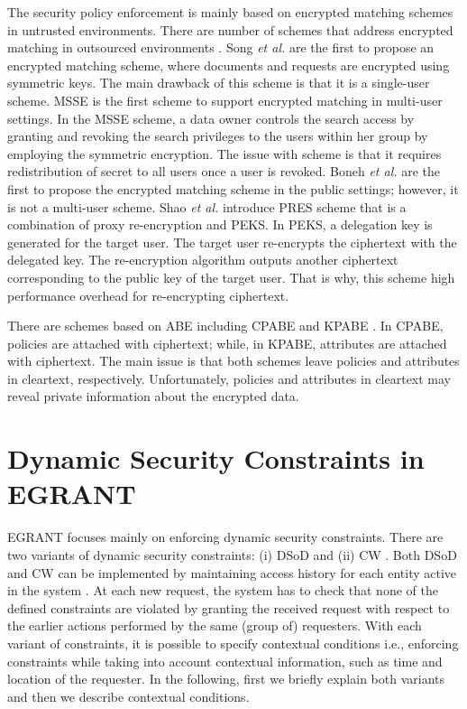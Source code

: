 \documentclass[epsfig,a4paper,11pt,titlepage]{book}
\numberwithin{algorithm}{chapter}
\begin{document}
The security policy enforcement is mainly based on encrypted matching schemes in untrusted environments. There are number of schemes that address encrypted matching in outsourced environments \cite{Shao:2010, Bethencourt:2007, Curtmola:2006, Goyal:2006, Boneh:2004, Song:2000}. Song \emph{et al.} \cite{Song:2000} are the first to propose an encrypted matching scheme, where documents and requests are encrypted using symmetric keys. The main drawback of this scheme is that it is a single-user scheme. \gls{MSSE} \cite{Curtmola:2006} is the first scheme to support encrypted matching in multi-user settings. In the \gls{MSSE} scheme, a data owner controls the search access by granting and revoking the search privileges to the users within her group by employing the symmetric encryption. The issue with scheme is that it requires redistribution of secret to all users once a user is revoked. Boneh \emph{et al.} \cite{Boneh:2004} are the first to propose the encrypted matching scheme in the public settings; however, it is not a multi-user scheme. Shao \emph{et al.} \cite{Shao:2010} introduce \gls{PRES} scheme that is a combination of proxy re-encryption and \gls{PEKS}. In \gls{PEKS}, a delegation key is generated for the target user. The target user re-encrypts the ciphertext with the delegated key. The re-encryption algorithm outputs another ciphertext corresponding to the public key of the target user. That is why, this scheme high performance overhead for re-encrypting ciphertext. 

There are schemes based on \gls{ABE} including \gls{CPABE} \cite{Bethencourt:2007} and \gls{KPABE} \cite{Goyal:2006}. In \gls{CPABE}, policies are attached with ciphertext; while, in \gls{KPABE}, attributes are attached with ciphertext. The main issue is that both schemes leave policies and attributes in cleartext, respectively. Unfortunately, policies and attributes in cleartext may reveal private information about the encrypted data.



\section[Dynamic Security Constraints in E-GRANT]{Dynamic Security Constraints in \acrshort{EGRANT}}
\label{sec:egrant-dynamic-security-constraints}
\gls{EGRANT} focuses mainly on enforcing dynamic security constraints. There are two variants of dynamic security constraints: (i) \gls{DSoD} \cite{Kong:2007, Sandhu:1996, Nash:1990} and (ii) \gls{CW} \cite{Brewer:1989}. Both \gls{DSoD} and \gls{CW} can be implemented by maintaining access history for each entity active in the system \cite{Hu:2006}. At each new request, the system has to check that none of the defined constraints are violated by granting the received request with respect to the earlier actions performed by the same (group of) requesters. With each variant of constraints, it is possible to specify contextual conditions i.e., enforcing constraints while taking into account contextual information, such as time and location of the requester. In the following, first we briefly explain both variants and then we describe contextual conditions.
\end{document}
